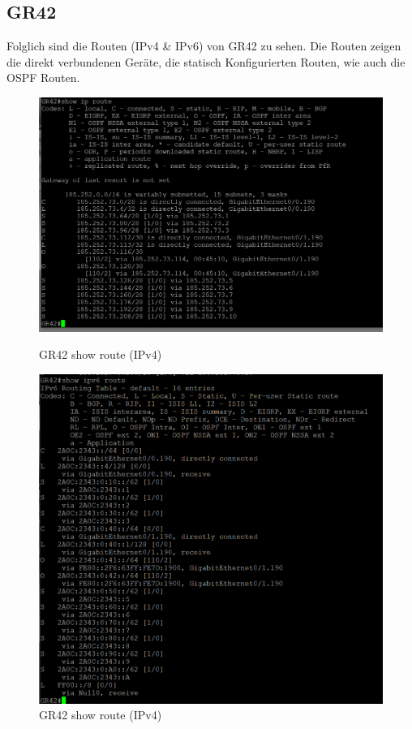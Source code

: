 \documentclass{article}
\begin{document}
\subsection{GR42}
Folglich sind die Routen (IPv4 \& IPv6) von GR42 zu sehen. Die Routen zeigen die direkt verbundenen Geräte, die statisch Konfigurierten Routen, wie auch die OSPF Routen.\\
\begin{figure}[!htp]
  \centering
  \begin{minipage}[b]{0.45\textwidth}
    \includegraphics[width=\textwidth]{Arbeitsergebnisse/gr42/gr42_show_ip_route.png}
    \caption{GR42 show route (IPv4)}
  \end{minipage}
  \hspace{0.8cm}
  \begin{minipage}[b]{0.45\textwidth}
    \includegraphics[width=\textwidth]{Arbeitsergebnisse/gr42/gr42_show_ipv6_route.png}
    \caption{GR42 show route (IPv4)}
  \end{minipage}
\end{figure}
\end{document}
